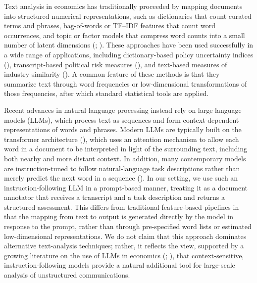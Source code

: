 Text analysis in economics has traditionally proceeded by mapping documents into structured numerical representations, such as dictionaries that count curated terms and phrases, bag-of-words or TF--IDF features that count word occurrences, and topic or factor models that compress word counts into a small number of latent dimensions (\textcite{gentzkow2019text}; \textcite{blei2003latent}). These approaches have been used successfully in a wide range of applications, including dictionary-based policy uncertainty indices (\textcite{baker2016measuring}), transcript-based political risk measures (\textcite{hassan2019firm}), and text-based measures of industry similarity (\textcite{hobergphillips2016textbased}). A common feature of these methods is that they summarize text through word frequencies or low-dimensional transformations of those frequencies, after which standard statistical tools are applied.

Recent advances in natural language processing instead rely on large language models (LLMs), which process text as sequences and form context-dependent representations of words and phrases. Modern LLMs are typically built on the transformer architecture (\textcite{vaswani2017attention}), which uses an attention mechanism to allow each word in a document to be interpreted in light of the surrounding text, including both nearby and more distant context. In addition, many contemporary models are instruction-tuned to follow natural-language task descriptions rather than merely predict the next word in a sequence (\textcite{ouyang2022training}). In our setting, we use such an instruction-following LLM in a prompt-based manner, treating it as a document annotator that receives a transcript and a task description and returns a structured assessment. This differs from traditional feature-based pipelines in that the mapping from text to output is generated directly by the model in response to the prompt, rather than through pre-specified word lists or estimated low-dimensional representations. We do not claim that this approach dominates alternative text-analysis techniques; rather, it reflects the view, supported by a growing literature on the use of LLMs in economics (\textcite{korinek2023generative}; \textcite{ludwig2025applied}), that context-sensitive, instruction-following models provide a natural additional tool for large-scale analysis of unstructured communications.
